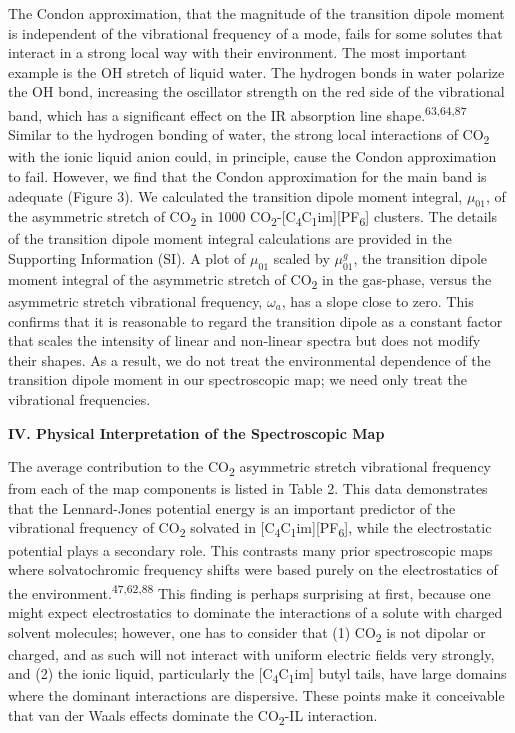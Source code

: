 \documentclass[]{article}
\begin{document}
The Condon approximation, that the magnitude of the transition dipole
moment is independent of the vibrational frequency of a mode, fails for
some solutes that interact in a strong local way with their environment.
The most important example is the OH stretch of liquid water. The
hydrogen bonds in water polarize the OH bond, increasing the oscillator
strength on the red side of the vibrational band, which has a
significant effect on the IR absorption line
shape.\textsuperscript{63,64,87} Similar to the hydrogen bonding of
water, the strong local interactions of CO\textsubscript{2} with the
ionic liquid anion could, in principle, cause the Condon approximation
to fail. However, we find that the Condon approximation for the main
band is adequate (Figure 3). We calculated the transition dipole moment
integral, \(\mu_{01}\), of the asymmetric stretch of CO\textsubscript{2}
in 1000
CO\textsubscript{2}-{[}C\textsubscript{4}C\textsubscript{1}im{]}{[}PF\textsubscript{6}{]}
clusters. The details of the transition dipole moment integral
calculations are provided in the Supporting Information (SI). A plot of
\(\mu_{01}\) scaled by \(\mu_{01}^{g}\), the transition dipole moment
integral of the asymmetric stretch of CO\textsubscript{2} in the
gas-phase, versus the asymmetric stretch vibrational frequency,
\(\omega_{a}\), has a slope close to zero. This confirms that it is
reasonable to regard the transition dipole as a constant factor that
scales the intensity of linear and non-linear spectra but does not
modify their shapes. As a result, we do not treat the environmental
dependence of the transition dipole moment in our spectroscopic map; we
need only treat the vibrational frequencies.

\textbf{IV. Physical Interpretation of the Spectroscopic Map}

The average contribution to the CO\textsubscript{2} asymmetric stretch
vibrational frequency from each of the map components is listed in Table
2. This data demonstrates that the Lennard-Jones potential energy is an
important predictor of the vibrational frequency of CO\textsubscript{2}
solvated in
{[}C\textsubscript{4}C\textsubscript{1}im{]}{[}PF\textsubscript{6}{]},
while the electrostatic potential plays a secondary role. This contrasts
many prior spectroscopic maps where solvatochromic frequency shifts were
based purely on the electrostatics of the
environment.\textsuperscript{47,62,88} This finding is perhaps
surprising at first, because one might expect electrostatics to dominate
the interactions of a solute with charged solvent molecules; however,
one has to consider that (1) CO\textsubscript{2} is not dipolar or
charged, and as such will not interact with uniform electric fields very
strongly, and (2) the ionic liquid, particularly the
{[}C\textsubscript{4}C\textsubscript{1}im{]} butyl tails, have large
domains where the dominant interactions are dispersive. These points
make it conceivable that van der Waals effects dominate the
CO\textsubscript{2}-IL interaction.
\end{document}
